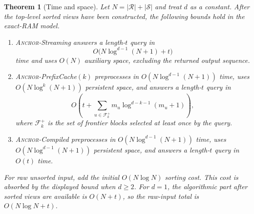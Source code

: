 \documentclass[11pt]{article}
\DeclareRobustCommand{\ANCHOR}{\textnormal{\textsc{Anchor}}}
\newtheorem{theorem}{Theorem}[section]
\theoremstyle{definition}
\begin{document}
\begin{theorem}[Time and space]
\label{thm:complexity}
Let $N=|\mathcal R|+|\mathcal S|$ and treat $d$ as a constant.  After the top-level sorted views have been constructed, the following bounds hold in the exact-RAM model.
\begin{enumerate}[leftmargin=1.6em,itemsep=2pt,topsep=2pt]
\item \ANCHOR-Streaming answers a length-$t$ query in
\[
  O\bigl(N\log^{d-1}(N+1)+t\bigr)
\]
time and uses $O(N)$ auxiliary space, excluding the returned output sequence.
\item \ANCHOR-PrefixCache$(k)$ preprocesses in $O(N\log^{d-1}(N+1))$ time, uses $O(N\log^k(N+1))$ persistent space, and answers a length-$t$ query in
\[
  O\left(
    t+
    \sum_{u\in\mathcal F_k^+}
      m_u\log^{d-k-1}(m_u+1)
  \right),
\]
where $\mathcal F_k^+$ is the set of frontier blocks selected at least once by the query.
\item \ANCHOR-Compiled preprocesses in $O(N\log^{d-1}(N+1))$ time, uses $O(N\log^{d-1}(N+1))$ persistent space, and answers a length-$t$ query in $O(t)$ time.
\end{enumerate}
For raw unsorted input, add the initial $O(N\log N)$ sorting cost.  This cost is absorbed by the displayed bound when $d\ge2$.  For $d=1$, the algorithmic part after sorted views are available is $O(N+t)$, so the raw-input total is $O(N\log N+t)$.
\end{theorem}
\end{document}
